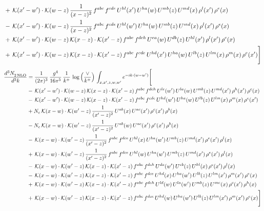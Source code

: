 \documentclass[9pt]{article}
\numberwithin{equation}{section}
\begin{document}
\begin{align}
&+\,\mathcal{K}(x'-w')\cdot\mathcal{K}(w-z)\,\frac{1}{(x-z)^{2}}\,f^{abc}\,f^{cde}\,U^{hl}(x')\,U^{ha}(w)\,U^{mb}(z)\,U^{md}(x)\,\rho^{l}(x')\,\rho^{e}(x)\notag \\ 
&-\,\mathcal{K}(x'-w')\cdot\mathcal{K}(w-z)\,\frac{1}{(x-z)^{2}}\,f^{abc}\,f^{cde}\,U^{hl}(w')\,U^{ha}(w)\,U^{mb}(z)\,U^{md}(x)\,\rho^{l}(x')\,\rho^{e}(x)\notag \\ 
&+\,\mathcal{K}(x'-w')\cdot\mathcal{K}(w-z)\,\mathcal{K}(x-z)\cdot\mathcal{K}(x'-z)\,f^{abc}\,f^{deh}\,U^{ea}(w)\,U^{db}(z)\,U^{hl}(x')\,\rho^{l}(x')\,\rho^{c}(x)\notag \\ 
&+\,\mathcal{K}(x'-w')\cdot\mathcal{K}(w-z)\,\mathcal{K}(x-z)\cdot\mathcal{K}(x'-z)\,f^{abc}\,f^{cde}\,U^{hd}(x')\,U^{ha}(w)\,U^{lb}(z)\,U^{lm}(x)\,\rho^{m}(x)\,\rho^{e}(x')\Bigg]
\end{align}    
\begin{align}
    \frac{d^{3}N_{2\,\rm NLO}^{\rm}}{d^{3}k}  & = \frac{1}{(2\pi)^{3}}\,\frac{g^{4}}{16\pi^{5}}\,\frac{1}{k^{+}}\,\log{\left(\frac{\vee}{k^{+}}\right)}\, \int_{x,x',z,w,w'}e^{-ik\cdot (w-w')}\Bigg[\notag\\ & -\,\mathcal{K}(x'-w')\cdot\mathcal{K}(w-z)\,\mathcal{K}(x-z)\cdot\mathcal{K}(x'-z)\,f^{abc}\,f^{deh}\,U^{le}(w')\,U^{la}(w)\,U^{mb}(z)\,U^{md}(x')\,\rho^{h}(x')\,\rho^{c}(x)\notag \\ 
&-\,\mathcal{K}(x'-w')\cdot\mathcal{K}(w-z)\,\mathcal{K}(x-z)\cdot\mathcal{K}(x'-z)\,f^{abc}\,f^{cde}\,U^{hd}(w')\,U^{ha}(w)\,U^{lb}(z)\,U^{lm}(x)\,\rho^{m}(x)\,\rho^{e}(x')\notag \\ 
&+N_{c}\,\mathcal{K}(x-w)\cdot\mathcal{K}(w'-z)\,\frac{1}{(x'-z)^{2}}\,U^{ab}(x)\,U^{ac}(x')\,\rho^{c}(x')\,\rho^{b}(x)\notag \\ 
&-N_{c}\,\mathcal{K}(x-w)\cdot\mathcal{K}(w'-z)\,\frac{1}{(x'-z)^{2}}\,U^{ab}(w)\,U^{ac}(x')\,\rho^{c}(x')\,\rho^{b}(x)\notag \\ 
&-\,\mathcal{K}(x-w)\cdot\mathcal{K}(w'-z)\,\frac{1}{(x'-z)^{2}}\,f^{abc}\,f^{dce}\,U^{hl}(x)\,U^{ha}(w')\,U^{mb}(z)\,U^{md}(x')\,\rho^{e}(x')\,\rho^{l}(x) \notag \\ & +\,\mathcal{K}(x-w)\cdot\mathcal{K}(w'-z)\,\frac{1}{(x'-z)^{2}}\,f^{abc}\,f^{dce}\,U^{hl}(w)\,U^{ha}(w')\,U^{mb}(z)\,U^{md}(x')\,\rho^{e}(x')\,\rho^{l}(x)\notag \\ 
&-\,\mathcal{K}(x-w)\cdot\mathcal{K}(w'-z)\,\mathcal{K}(x-z)\cdot\mathcal{K}(x'-z)\,f^{abc}\,f^{deh}\,U^{da}(w')\,U^{eb}(z)\,U^{hl}(x)\,\rho^{c}(x')\,\rho^{l}(x)\notag \\ 
&-\,\mathcal{K}(x-w)\cdot\mathcal{K}(w'-z)\,\mathcal{K}(x-z)\cdot\mathcal{K}(x'-z)\,f^{abc}\,f^{dce}\,U^{hd}(x)\,U^{ha}(w')\,U^{lb}(z)\,U^{lm}(x')\,\rho^{m}(x')\,\rho^{e}(x)\notag \\ 
&+\,\mathcal{K}(x-w)\cdot\mathcal{K}(w'-z)\,\mathcal{K}(x-z)\cdot\mathcal{K}(x'-z)\,f^{abc}\,f^{deh}\,U^{ld}(w)\,U^{la}(w')\,U^{mb}(z)\,U^{me}(x)\,\rho^{c}(x')\,\rho^{h}(x)\notag \\ 
&+\,\mathcal{K}(x-w)\cdot\mathcal{K}(w'-z)\,\mathcal{K}(x-z)\cdot\mathcal{K}(x'-z)\,f^{abc}\,f^{dce}\,U^{hd}(w)\,U^{ha}(w')\,U^{lb}(z)\,U^{lm}(x')\,\rho^{m}(x')\,\rho^{e}(x)\Bigg]
\end{align}
\end{document}
